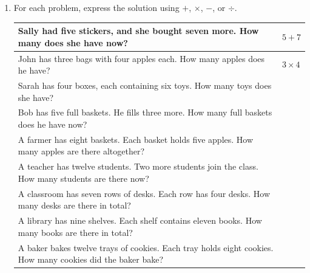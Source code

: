 \documentclass{tufte-book}
\providecommand{\tabularnewline}{\\}
\begin{document}
\begin{enumerate}
\item For each problem, express the solution using $+$, $\times$, $-$, or $\div$.
\begin{tabular}{>{}p{}>{\centering}b{}}
\toprule 
Sally had five stickers, and she bought seven more. How many does she have now? & $5 + 7$\tabularnewline
\midrule
John has three bags with four apples each. 
How many apples does he have? & $3 \times 4$ \tabularnewline
\midrule
Sarah has four boxes, each containing six toys. How many toys does
she have? & \tabularnewline
\midrule 
Bob has five full baskets. He fills three more. How many full baskets
does he have now? & \tabularnewline
\midrule 
A farmer has eight baskets. Each basket holds five apples. How many
apples are there altogether? & \tabularnewline
\midrule 
A teacher has twelve students. Two more students join the class. How
many students are there now? & \tabularnewline
\midrule 
A classroom has seven rows of desks. Each row has four desks. How
many desks are there in total? & \tabularnewline
\midrule 
A library has nine shelves. Each shelf contains eleven books. How
many books are there in total? & \tabularnewline
\midrule 
A baker bakes twelve trays of cookies. Each tray holds eight cookies.
How many cookies did the baker bake? & \tabularnewline
\bottomrule
\end{tabular}
\end{enumerate}
\end{document}
